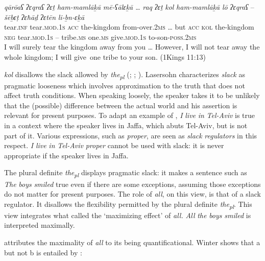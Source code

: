 \documentclass[output=paper]{langsci/langscibook}
\begin{document}
\ea%
    \label{ex:doron:23}
    \gll \textit{qārōaʕ}   \textit{ʔɛqraʕ}          \textit{ʔɛṯ}   \textit{ham-mamlāḵā}   \textit{mē-ʕālɛḵā} \textit{…} \textit{raq} \textit{ʔɛṯ}   \textit{kol}   \textit{ham-mamlāḵā} \textit{lō}      \textit{ʔɛqraʕ}          –   \textit{šēḇɛṭ}      \textit{ʔɛħāḏ}    \textit{ʔɛtēn}               \textit{li-ḇn-ɛḵā}\\
         tear.\textsc{inf}  tear.\textsc{mod.1s} \textsc{acc} the-kingdom     from-over.2\textsc{ms} \textsc{…} but \textsc{acc} \textsc{kol} the-kingdom    \textsc{neg}  tear.\textsc{mod.1s}  –   tribe\textsc{.ms} one.\textsc{ms}  give.\textsc{mod.1s}   to-son-\textsc{poss.2ms}\\
    \glt I will surely tear the kingdom away from you … However, I will not tear away the whole kingdom; I will give~one tribe to your son. (1Kings 11:13)
    \z

\textit{kol} disallows the slack allowed by \textit{the\textsubscript{pl}} (\citealt{Krifka2006}; \citealt{Lasersohn1999}; \citealt{Schwarz2013}). Lasersohn characterizes \textit{slack} as pragmatic looseness which involves approximation to the truth that does not affect truth conditions. When speaking loosely, the speaker takes it to be unlikely that the (possible) difference between the actual world and his assertion is relevant for present purposes. To adapt an example of \citet{Lauer2012}, \textit{I} \textit{live} \textit{in} \textit{Tel-Aviv} is true in a context where the speaker lives in Jaffa, which abuts Tel-Aviv, but is not part of it. Various expressions, such as \textit{proper}, are seen as \textit{slack} \textit{regulators} in this respect. \textit{I} \textit{live} \textit{in} \textit{Tel-Aviv} \textit{proper} cannot be used with slack: it is never appropriate if the speaker lives in Jaffa. 

The plural definite \textit{the\textsubscript{pl}} displays pragmatic slack: it makes a sentence such as \textit{The} \textit{boys} \textit{smiled} true even if there are some exceptions, assuming those exceptions do not matter for present purposes. The role of \textit{all}, on this view, is that of a slack regulator. It disallows the flexibility permitted by the plural definite \textit{the\textsubscript{pl}}. This view integrates what \citet{Dowty1987} called the ‘maximizing effect’ of \textit{all.} \textit{All} \textit{the} \textit{boys} \textit{smiled} is interpreted maximally. 

\citet{Winter2001} attributes the maximality of \textit{all} to its being quantificational. Winter shows that a but not b is entailed by : 
\end{document}
